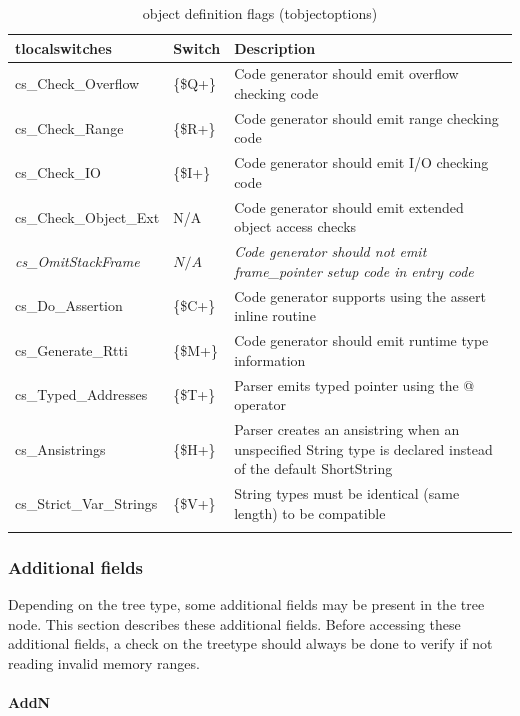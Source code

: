 \documentclass [a4paper,12pt]{article}
\begin{document}
\begin{longtable}{|l|l|p{10cm}|}
\hline
tlocalswitches & Switch & Description \\
\hline
\endhead
\hline
\endfoot
\textsf{cs{\_}Check{\_}Overflow} 	&  {\{}{\$}Q+{\}}&
	Code generator should emit overflow checking code  \\
\textsf{cs{\_}Check{\_}Range}    	&  {\{}{\$}R+{\}}&
	Code generator should emit range checking code  \\
\textsf{cs{\_}Check{\_}IO} 	 	&  {\{}{\$}I+{\}}&
	Code generator should emit I/O checking code \\
\textsf{cs{\_}Check{\_}Object{\_}Ext} 	&  N/A&
	Code generator should emit extended object access checks \\
\textsf{\textit{cs{\_}OmitStackFrame}}	&  $N/A$ &
	\textit{Code generator should not emit frame{\_}pointer setup code
	in entry code} \\
\textsf{cs{\_}Do{\_}Assertion}		& {\{}{\$}C+{\}} & 
	Code generator supports using the assert inline routine \\
\textsf{cs{\_}Generate{\_}Rtti} 	& {\{}{\$}M+{\}} &
	Code generator should emit runtime type information \\
\textsf{cs{\_}Typed{\_}Addresses} 	& {\{}{\$}T+{\}}&
	Parser emits typed pointer using the @ operator  \\
\textsf{cs{\_}Ansistrings}		& {\{}{\$}H+{\}}&
	Parser creates an \textsf{ansistring} when an unspecified
	\textsf{String} type is declared instead of the default
	\textsf{ShortString} \\
\textsf{cs{\_}Strict{\_}Var{\_}Strings} & {\{}{\$}V+{\}}&
	String types must be identical (same length) to be compatible \\
\hline
\caption{object definition flags (tobjectoptions)}
\label{tab8}
\end{longtable}

\subsubsection{Additional fields}
\label{subsubsec:additional}

Depending on the tree type, some additional fields may be present in the
tree node. This section describes these additional fields. Before accessing
these additional fields, a check on the \textsf{treetype} should always be
done to verify if not reading invalid memory ranges.

\paragraph{AddN}\mbox{}
\end{document}
